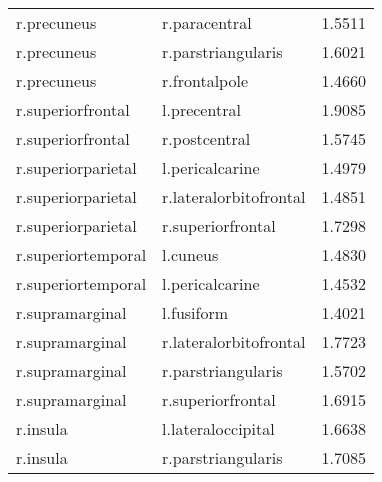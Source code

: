 \begin{table}
\begin{tabular}{llr}
r.precuneus & r.paracentral & 1.5511 \\
r.precuneus & r.parstriangularis & 1.6021 \\
r.precuneus & r.frontalpole & 1.4660 \\
r.superiorfrontal & l.precentral & 1.9085 \\
r.superiorfrontal & r.postcentral & 1.5745 \\
r.superiorparietal & l.pericalcarine & 1.4979 \\
r.superiorparietal & r.lateralorbitofrontal & 1.4851 \\
r.superiorparietal & r.superiorfrontal & 1.7298 \\
r.superiortemporal & l.cuneus & 1.4830 \\
r.superiortemporal & l.pericalcarine & 1.4532 \\
r.supramarginal & l.fusiform & 1.4021 \\
r.supramarginal & r.lateralorbitofrontal & 1.7723 \\
r.supramarginal & r.parstriangularis & 1.5702 \\
r.supramarginal & r.superiorfrontal & 1.6915 \\
r.insula & l.lateraloccipital & 1.6638 \\
r.insula & r.parstriangularis & 1.7085 \\
\bottomrule
\end{tabular}
\end{table}
